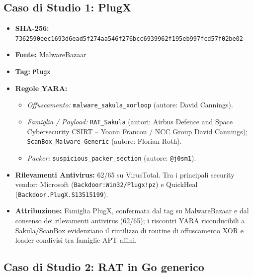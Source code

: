 \documentclass[11pt, a4paper]{article}
\begin{document}
	\subsection{Caso di Studio 1: PlugX}
	
	\begin{itemize}
		\item \textbf{SHA-256:} {\small\texttt{7362590eec1693d6ead5f274aa546f276bcc6939962f195eb997fcd57f02be02}}
		\item \textbf{Fonte:} MalwareBazaar
		\item \textbf{Tag:} \texttt{Plugx}
		\item \textbf{Regole YARA:}
		\begin{itemize}
			\item \textit{Offuscamento:} \texttt{malware\_\allowbreak{}sakula\_\allowbreak{}xorloop} (autore: David Cannings).
			\item \textit{Famiglia / Payload:} \texttt{RAT\_Sakula} (autori: Airbus Defence and Space Cybersecurity CSIRT -- Yoann Francou / NCC Group David Cannings); \texttt{Scan\allowbreak{}Box\_\allowbreak{}Malware\_\allowbreak{}Generic} (autore: Florian Roth).
			\item \textit{Packer:} \texttt{suspicious\_\allowbreak{}packer\_\allowbreak{}section} (autore: \texttt{@j0sm1}).
		\end{itemize}
		\item \textbf{Rilevamenti Antivirus:} 62/65 su VirusTotal. Tra i principali security vendor: Microsoft (\texttt{Backdoor:Win32/\allowbreak{}Plugx!pz}) e QuickHeal (\texttt{Backdoor.\allowbreak{}PlugX.\allowbreak{}S13515199}).
		\item \textbf{Attribuzione:} Famiglia PlugX, confermata dal tag su MalwareBazaar e dal consenso dei rilevamenti antivirus (62/65); i riscontri YARA riconducibili a Sakula/ScanBox evidenziano il riutilizzo di routine di offuscamento XOR e loader condivisi tra famiglie APT affini.
	\end{itemize}
	
	\subsection{Caso di Studio 2: RAT in Go generico}
	
\end{document}
